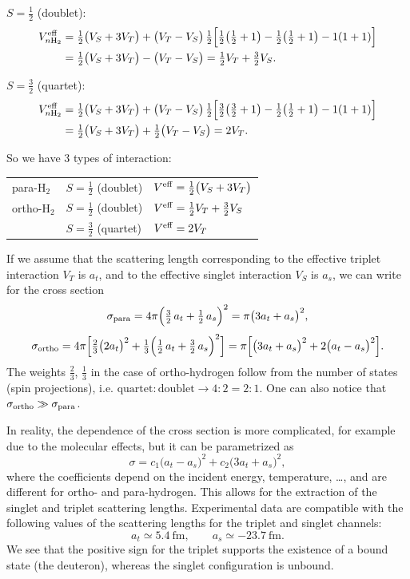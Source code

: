 \documentclass[11pt,a4paper]{article}
\begin{document}
$S=\tfrac12$ (doublet):
\begin{align*}
V^{\rm eff}_{n\rm H_2}&=\tfrac12\big(V_S+3V_T\big)+\big(V_T-V_S\big)\,\tfrac12
\Big[\tfrac12\big(\tfrac12+1\big)-\tfrac12\big(\tfrac12+1\big)-1(1+1)\Big]\\
&=\tfrac12\big(V_S+3V_T\big)-\big(V_T-V_S\big)
=\tfrac12V_T+\tfrac32V_S. 
\end{align*}

$S=\tfrac32$ (quartet):
\begin{align*}
V^{\rm eff}_{n\rm H_2}&=\tfrac12\big(V_S+3V_T\big)+\big(V_T-V_S\big)\,\tfrac12
\Big[\tfrac32\big(\tfrac32+1\big)-\tfrac12\big(\tfrac12+1\big)-1(1+1)\Big]\\
&=\tfrac12\big(V_S+3V_T\big)+\tfrac12\big(V_T-V_S\big)=2V_T .
\end{align*}

So we have 3 types of interaction:
\begin{center}
\renewcommand{\arraystretch}{1.5}
\begin{tabular}{l l l}
para-H$_2$ & $S=\tfrac12$ (doublet) & $V^{\rm eff}=\tfrac12\big(V_S+3V_T\big)$ \\
ortho-H$_2$ & $S=\tfrac12$ (doublet) & $V^{\rm eff}=\tfrac12V_T+\tfrac32V_S$ \\
 & $S=\tfrac32$ (quartet) & $V^{\rm eff}=2V_T$
\end{tabular}
\end{center}
If we assume that the scattering length corresponding to the effective triplet interaction $V_T$ is $a_t$, and to the effective singlet interaction $V_S$ is $a_s$, we can write for the cross section 
\[
\sigma_{\rm para}=4\pi\Big(\tfrac32\,a_t+\tfrac12\,a_s\Big)^2=\pi\big(3a_t+a_s\big)^2,
\]
\[
\sigma_{\rm ortho}=4\pi\Big[\tfrac23\big(2a_t\big)^2
+\tfrac13\Big(\tfrac12\,a_t+\tfrac32\,a_s\Big)^2\Big]
=\pi\Big[\big(3a_t+a_s\big)^2+2\big(a_t-a_s\big)^2\Big].
\]
The weights $\tfrac23$, $\tfrac13$ in the case of ortho-hydrogen follow from the number of states (spin projections), i.e. $\text{quartet} : \text{doublet} \rightarrow 4:2=2:1$.
One can also notice that $\sigma_{\rm ortho}\gg\sigma_{\rm para}$.


In reality, the dependence of the cross section is more complicated, for example due to the molecular effects, but it can be parametrized as
\[
\sigma=c_1\big(a_t-a_s\big)^2+c_2\big(3a_t+a_s\big)^2,
\]
where the coefficients depend on the incident energy, temperature, \dots, and
are different for ortho- and para-hydrogen. This allows for the extraction of the singlet and triplet scattering lengths.
Experimental data are compatible with the following values of the scattering lengths for the triplet and singlet channels:   
\[
a_t\simeq5.4\ \text{fm},\qquad a_s\simeq-23.7\ \text{fm}.
\]
We see that the positive sign for the triplet supports the existence of a bound state (the deuteron), whereas the singlet configuration is unbound. 
\end{document}
